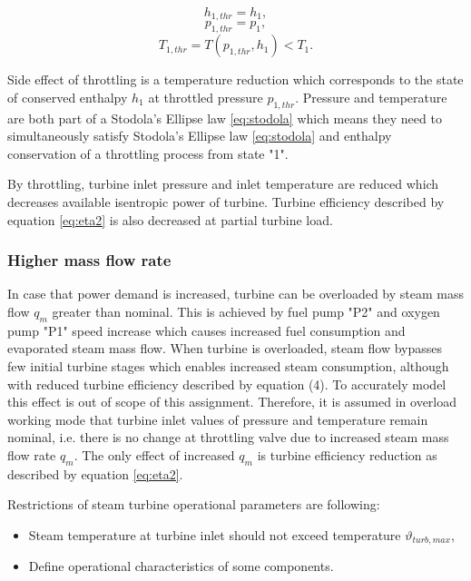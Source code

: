 \documentclass{article}
\begin{document}
	\begin{equation}\label{eq:ent_preserve1}
		h_{1,thr} = h_1,
	\end{equation}
	\begin{equation}\label{eq:ent_preserve2}
	p_{1,thr} = p_1,
	\end{equation}
	\begin{equation}\label{eq:ent_preserve3}
	T_{1,thr} = T(p_{1,thr},h_1) < T_1.
	\end{equation}
	
	Side effect of throttling is a temperature reduction which corresponds to the state of conserved enthalpy $h_1$ at throttled pressure $p_{1,thr}$. Pressure and temperature are both part of a Stodola’s Ellipse law \ref{eq:stodola} which means they need to simultaneously satisfy Stodola’s Ellipse law  \ref{eq:stodola}  and enthalpy conservation of a throttling process from state "1".
	
	By throttling, turbine inlet pressure and inlet temperature are reduced which decreases available isentropic power of turbine. Turbine efficiency described by equation \ref{eq:eta2} is also decreased at partial turbine load.
	
	\subsubsection*{Higher mass flow rate}
	
	In case that power demand is increased, turbine can be overloaded by steam mass flow $q_m$ greater than nominal. This is achieved by fuel pump "P2" and oxygen pump "P1" speed increase which causes increased fuel consumption and evaporated steam mass flow. When turbine is overloaded, steam flow bypasses few initial turbine stages which enables increased steam consumption, although with reduced turbine efficiency described by equation (4). To accurately model this effect is out of scope of this assignment. Therefore, it is assumed in overload working mode that turbine inlet values of pressure and temperature remain nominal, i.e. there is no change at throttling valve due to increased steam mass flow rate $q_m$. The only effect of increased $q_m$ is turbine efficiency reduction as described by equation \ref{eq:eta2}.
	
	Restrictions of steam turbine operational parameters are following:
	
	\begin{itemize}
		\item Steam temperature at turbine inlet should not exceed temperature $\vartheta_{turb,max}$,
		\item Define operational characteristics of some components.
	\end{itemize}
	
\end{document}
